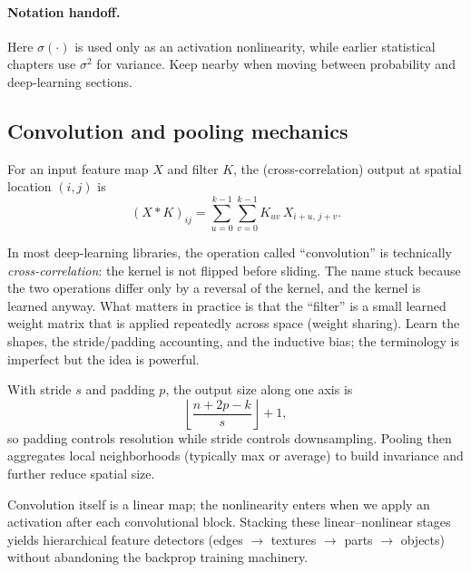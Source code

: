 \paragraph{Notation handoff.}
Here \(\sigma(\cdot)\) is used only as an activation nonlinearity, while earlier statistical chapters use \(\sigma^2\) for variance. Keep  nearby when moving between probability and deep-learning sections.

\subsection{Convolution and pooling mechanics}
\label{sec:cnn_convolution_and_pooling_mechanics}

For an input feature map \(X\) and filter \(K\), the (cross-correlation) output at spatial location \((i, j)\) is
\begin{equation}
(X * K)_{ij} = \sum_{u=0}^{k-1} \sum_{v=0}^{k-1} K_{uv}\, X_{i+u,\, j+v}.
\label{eq:cnn_cross_correlation}
\end{equation}

\begin{tcolorbox}[summarybox, title={Author's note: ``convolution'' vs.\ cross-correlation}]
In most deep-learning libraries, the operation called ``convolution'' is technically \emph{cross-correlation}: the kernel is not flipped before sliding. The name stuck because the two operations differ only by a reversal of the kernel, and the kernel is learned anyway. What matters in practice is that the ``filter'' is a small learned weight matrix that is applied repeatedly across space (weight sharing). Learn the shapes, the stride/padding accounting, and the inductive bias; the terminology is imperfect but the idea is powerful.
\end{tcolorbox}
With stride \(s\) and padding \(p\), the output size along one axis is
\begin{equation}
\left\lfloor \frac{n + 2p - k}{s} \right\rfloor + 1,
\label{eq:cnn_output_size}
\end{equation}
so padding controls resolution while stride controls downsampling. Pooling then aggregates local neighborhoods (typically max or average) to build invariance and further reduce spatial size.

Convolution itself is a linear map; the nonlinearity enters when we apply an activation after each convolutional block. Stacking these linear--nonlinear stages yields hierarchical feature detectors (edges \(\rightarrow\) textures \(\rightarrow\) parts \(\rightarrow\) objects) without abandoning the backprop training machinery.

